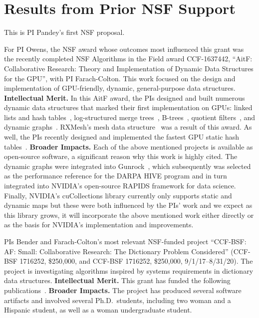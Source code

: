 \section{Results from Prior NSF Support}

This is PI Pandey's first NSF proposal.

For PI Owens, the NSF award whose outcomes most influenced this grant was the recently completed NSF Algorithms in the Field award CCF-1637442, ``AitF\@: Collaborative Research: Theory and Implementation of Dynamic Data Structures for the GPU'', with PI Farach-Colton. This work focused on the design and implementation of GPU-friendly, dynamic, general-purpose data structures.
\textbf{Intellectual Merit.} In this AitF award, the PIs designed and built numerous dynamic data structures that marked their first implementation on GPUs: linked lists and hash tables~\cite{Ashkiani:2018:ADH}, log-structured merge trees~\cite{Ashkiani:2018:GLA}, B-trees~\cite{Awad:2019:EAH}, quotient filters~\cite{GeilFO18}, and dynamic graphs~\cite{Awad:2020:DGO}. RXMesh's mesh data structure~\cite{Mahmoud:2021:RAG} was a result of this award. As well, the PIs recently designed and implemented the fastest GPU static hash tables~\cite{Awad:2023:AAI}.
%
\textbf{Broader Impacts.} Each of the above mentioned projects is available as open-source software, a significant reason why this work is highly cited. The dynamic graphs were integrated into Gunrock~\cite{Awad:2020:DGO,Wang:2017:GGG}, which subsequently was selected as the performance reference for the DARPA HIVE program and in turn integrated into NVIDIA's open-source RAPIDS framework for data science. Finally, NVIDIA's cuCollections library currently only supports static and dynamic maps but these were both influenced by the PIs' work and we expect as this library grows, it will incorporate the above mentioned work either directly or as the basis for NVIDIA's implementation and improvements.

PIs Bender and Farach-Colton's most relevant NSF-funded project ``CCF-BSF\@: AF\@: Small: Collaborative Research: The Dictionary Problem Considered''
(CCF-BSF 1716252, \$250,000, and CCF-BSF 1716252, \$250,000, 9/1/17--8/31/20).
The project is investigating algorithms inspired by systems requirements in dictionary data structures.
\textbf{Intellectual Merit.} This grant has funded the following
publications~\cite{AgrawalBeDa20,AgrawalBeFi20,%
ArkinDaGa20,Ashkiani:2018:ADH,Ashkiani:2018:GLA,BenderChDa20,BenderCoFa19,BenderDaJo20,BenderFaGo18,%
BenderFaKu19,BenderGoMe20,BenderKoKu20,ChenMcSi18,ConwayBaJi17b,ConwayFaSh18,ConwayKnJi19,%
DasAgBe20,DasTsDu19,BerceaEv20a,BerceaEv20b,%
ZhanCoJi18,ZhanJaPo18,Mayer18,Pandey19,PandeyABFJP18Cell,PandeyBJP17,%
PandeyBJP17a,PandeyBJP17b,Singh18,SinghMaBe20,%
JavanmardGaDa19DISC,%
GoswamiMeMe18,%
GeilFO18,pandey2020timely,%
EvenMeRa18,Awad:2019:EAH,BenderFiGi19,Farach-ColtonLiTs18,BenderKoPe18}.
%
\textbf{Broader Impacts.} The project has produced several software artifacts and involved several Ph.D.\ students, including two woman and a Hispanic student, as well as a woman undergraduate student.

